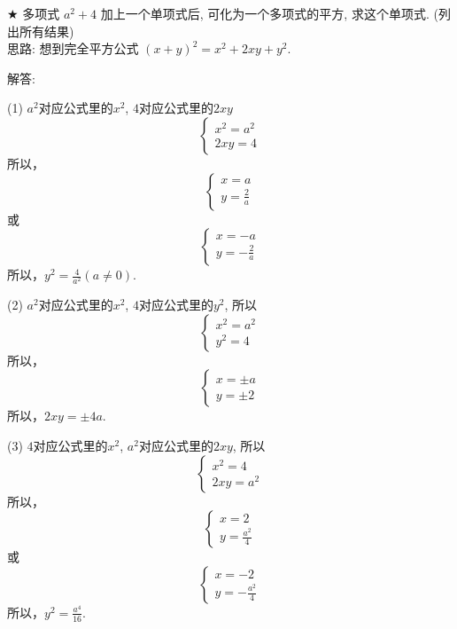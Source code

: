\item {
    $\bigstar$
    多项式 $a^2 + 4$ 加上一个单项式后, 可化为一个多项式的平方, 求这个单项式. (列出所有结果)
    \ifshowSolution
    \fangsong{}
    \\
    思路: 想到完全平方公式 $(x + y)^2 = x^2 + 2xy + y^2$. 

    解答: 

    (1) $a^2$对应公式里的$x^2$, $4$对应公式里的$2xy$
    \[\left\{ 
        \begin{array}{lc}
            x^2 = a^2\\
            2xy = 4
        \end{array}
    \right. \]
    所以，
    \[\left\{ 
        \begin{array}{lc}
            x = a\\
            y = \frac2a
        \end{array}
    \right. \]
    或
    \[\left\{ 
        \begin{array}{lc}
            x = -a\\
            y = -\frac2a
        \end{array}
    \right. \]
    所以，$y^2 = \frac{4}{a^2} (a\neq 0). $

    (2) $a^2$对应公式里的$x^2$, $4$对应公式里的$y^2$, 所以
    \[\left\{ 
        \begin{array}{lc}
            x^2 = a^2 \\
            y^2 = 4
        \end{array}
    \right. \]
    所以，
    \[\left\{ 
        \begin{array}{lc}
            x = \pm a \\
            y = \pm 2
        \end{array}
    \right. \]
    所以，$2xy = \pm 4a. $

    
    (3) $4$对应公式里的$x^2$, $a^2$对应公式里的$2xy$, 所以
    \[\left\{ 
        \begin{array}{lc}
            x^2 = 4 \\
            2xy = a^2
        \end{array}
    \right. \]
    所以，
    \[\left\{ 
        \begin{array}{lc}
            x = 2 \\
            y = \frac{a^2}{4}
        \end{array}
    \right. \]
    或
    \[\left\{ 
        \begin{array}{lc}
            x = -2 \\
            y = -\frac{a^2}{4}
        \end{array}
    \right. \]
    所以，$y^2 = \frac{a^4}{16}. $
    \else
        \\ \\ \\ \\ \\ \\
    \fi
}


